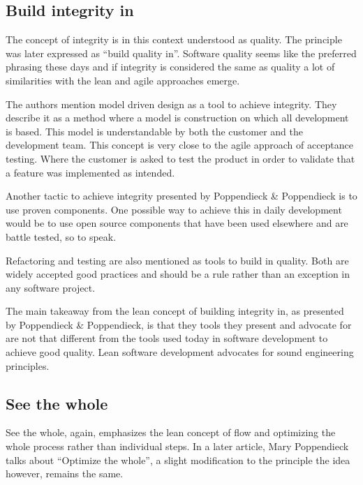 \subsection{Build integrity in}

The concept of integrity is in this context understood as quality. The principle was later expressed as ``build quality in''.\cite{Poppendieck2012Lean} Software quality seems like the preferred phrasing these days and if integrity is considered the same as quality a lot of similarities with the lean and agile approaches emerge.

The authors mention model driven design as a tool to achieve integrity. They describe it as a method where a model is construction on which all development is based. This model is understandable by both the customer and the development team.\cite{poppendieck2003lean} This concept is very close to the agile approach of acceptance testing. Where the customer is asked to test the product in order to validate that a feature was implemented as intended.

Another tactic to achieve integrity presented by Poppendieck \& Poppendieck is to use proven components.\cite{poppendieck2003lean} One possible way to achieve this in daily development would be to use open source components that have been used elsewhere and are battle tested, so to speak.

Refactoring and testing are also mentioned as tools to build in quality.\cite{poppendieck2003lean} Both are widely accepted good practices and should be a rule rather than an exception in any software project.

The main takeaway from the lean concept of building integrity in, as presented by Poppendieck \& Poppendieck, is that they tools they present and advocate for are not that different from the tools used today in software development to achieve good quality. Lean software development advocates for sound engineering principles.


\subsection{See the whole}

See the whole, again, emphasizes the lean concept of flow and optimizing the whole process rather than individual steps. In a later article, Mary Poppendieck talks about ``Optimize the whole'', a slight modification to the principle \cite{Poppendieck2012Lean} the idea however, remains the same. 

